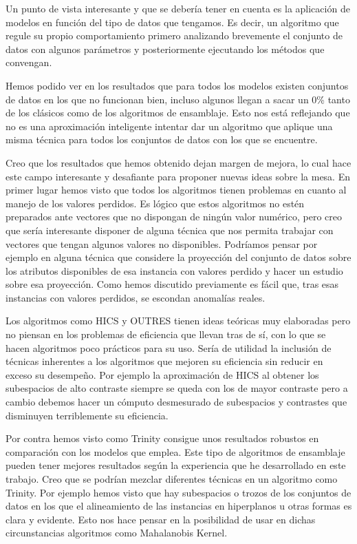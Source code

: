 Un punto de vista interesante y que se debería tener en cuenta es la aplicación de modelos en función del tipo de datos que tengamos. Es decir, un algoritmo que regule su propio comportamiento primero analizando brevemente el conjunto de datos con algunos parámetros y posteriormente ejecutando los métodos que convengan. 

Hemos podido ver en los resultados que para todos los modelos existen conjuntos de datos en los que no funcionan bien, incluso algunos llegan a sacar un 0\% tanto de los clásicos como de los algoritmos de ensamblaje. Esto nos está reflejando que no es una aproximación inteligente intentar dar un algoritmo que aplique una misma técnica para todos los conjuntos de datos con los que se encuentre.

Creo que los resultados que hemos obtenido dejan margen de mejora, lo cual hace este campo interesante y desafiante para proponer nuevas ideas sobre la mesa. En primer lugar hemos visto que todos los algoritmos tienen problemas en cuanto al manejo de los valores perdidos. Es lógico que estos algoritmos no estén preparados ante vectores que no dispongan de ningún valor numérico, pero creo que sería interesante disponer de alguna técnica que nos permita trabajar con vectores que tengan algunos valores no disponibles. Podríamos pensar por ejemplo en alguna técnica que considere la proyección del conjunto de datos sobre los atributos disponibles de esa instancia con valores perdido y hacer un estudio sobre esa proyección. Como hemos discutido previamente es fácil que, tras esas instancias con valores perdidos, se escondan anomalías reales. 

Los algoritmos como HICS y OUTRES tienen ideas teóricas muy elaboradas pero no piensan en los problemas de eficiencia que llevan tras de sí, con lo que se hacen algoritmos poco prácticos para su uso. Sería de utilidad la inclusión de técnicas inherentes a los algoritmos que mejoren su eficiencia sin reducir en exceso su desempeño. Por ejemplo la aproximación de HICS al obtener los subespacios de alto contraste siempre se queda con los de mayor contraste pero a cambio debemos hacer un cómputo desmesurado de subespacios y contrastes que disminuyen terriblemente su eficiencia.

Por contra hemos visto como Trinity consigue unos resultados robustos en comparación con los modelos que emplea. Este tipo de algoritmos de ensamblaje pueden tener mejores resultados según la experiencia que he desarrollado en este trabajo. Creo que se podrían mezclar diferentes técnicas en un algoritmo como Trinity. Por ejemplo hemos visto que hay subespacios o trozos de los conjuntos de datos en los que el alineamiento de las instancias en hiperplanos u otras formas es clara y evidente. Esto nos hace pensar en la posibilidad de usar en dichas circunstancias algoritmos como Mahalanobis Kernel. 

